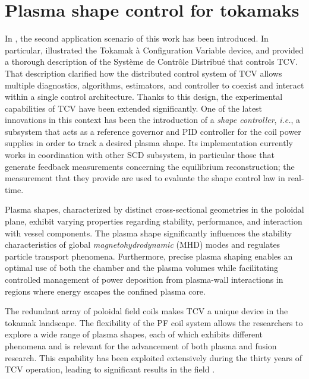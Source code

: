 \chapter{Plasma shape control for tokamaks}
\label{ch:allocation}
\vspace{-1.3cm}

In , the second application scenario of this work has been introduced. In particular,  illustrated the Tokamak à Configuration Variable device, and  provided a thorough description of the Système de Contrôle Distribué that controls TCV. That description clarified how the distributed control system of TCV allows multiple diagnostics, algorithms, estimators, and controller to coexist and interact within a single control architecture. Thanks to this design, the experimental capabilities of TCV have been extended significantly. One of the latest innovations in this context has been the introduction of a \emph{shape controller}, \emph{i.e.}, a subsystem that acts as a reference governor and PID controller for the coil power supplies in order to track a desired plasma shape. Its implementation currently works in coordination with other SCD subsystem, in particular those that generate feedback measurements concerning the equilibrium reconstruction; the measurement that they provide are used to evaluate the shape control law in real-time.

Plasma shapes, characterized by distinct cross-sectional geometries in the poloidal plane, exhibit varying properties regarding stability, performance, and interaction with vessel components. The plasma shape significantly influences the stability characteristics of global \emph{magnetohydrodynamic} (MHD) modes and regulates particle transport phenomena. Furthermore, precise plasma shaping enables an optimal use of both the chamber and the plasma volumes while facilitating controlled management of power deposition from plasma-wall interactions in regions where energy escapes the confined plasma core.

The redundant array of poloidal field coils makes TCV a unique device in the tokamak landscape. The flexibility of the PF coil system allows the researchers to explore a wide range of plasma shapes, each of which exhibits different phenomena and is relevant for the advancement of both plasma and fusion research. This capability has been exploited extensively during the thirty years of TCV operation, leading to significant results in the field \cite{hofmann_creation_1994,ambrosino_optimization_2014,piras_snowflake_2010,gorno_power_2023}.

